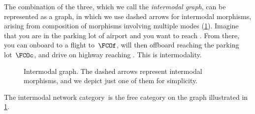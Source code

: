 \begin{example}
    The combination of the three, which we call the \emph{intermodal graph}, can be represented as a graph, in which we use dashed arrows for intermodal morphisms, arising from composition of morphisms involving multiple modes (\cref{fig:intermodal}).
    Imagine that you are in the parking lot of \ZRH airport and you want to reach .
    From there, you can onboard to a  flight to~$\FCOf$, will then offboard reaching the parking lot~$\FCOc$, and drive on highway  reaching .
    This is intermodality.

    \begin{figure}[h!]
        \centering
        \caption{Intermodal graph.
            The dashed arrows represent intermodal morphisms, and we depict just one of them for simplicity.
        }
        \label{fig:intermodal}
    \end{figure}
\end{example}

The intermodal network category~\Intermodal is the free category on the graph illustrated in \cref{fig:intermodal}.
